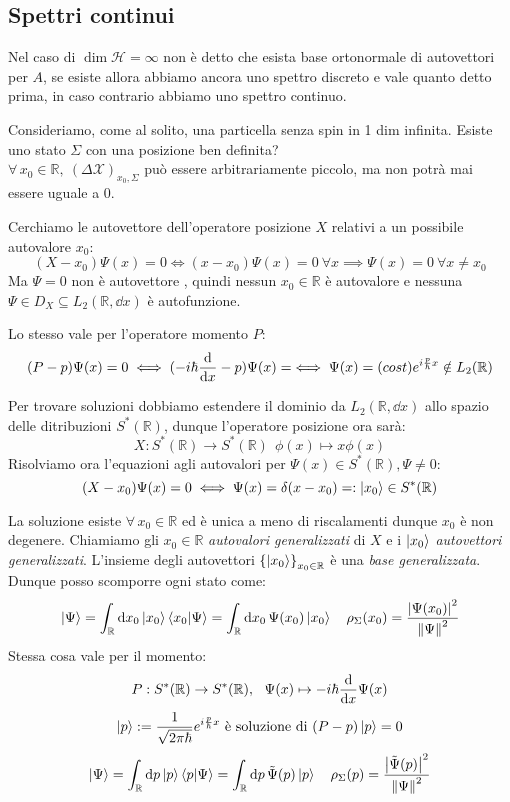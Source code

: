 \subsection{Spettri continui}

Nel caso di \(\dim \mathcal{H}= \infty\) non è detto che esista base ortonormale di autovettori per \(A\),
se esiste allora abbiamo ancora uno spettro discreto e vale quanto detto prima, in caso contrario abbiamo uno spettro continuo.

\begin{example}
    Consideriamo, come al solito, una particella senza spin in 1 dim infinita. Esiste uno stato \(\Sigma\) con una posizione ben definita?\\
    \(\forall\, x_0 \in \mathbb{R}, \ (\Delta \mathcal{X})_{x_0, \Sigma}\) può essere arbitrariamente piccolo, ma non potrà mai essere uguale a \(0\).
\end{example}

Cerchiamo le autovettore dell'operatore posizione \(X\) relativi a un possibile autovalore \(x_0\):
\[
    (X-x_0)\Psi(x)= 0 \iff (x-x_0)\Psi(x)= 0 \ \forall x \implies \Psi(x) = 0 \ \forall x \neq x_0
\]
Ma \(\Psi= 0\) non è autovettore , quindi nessun \(x_0 \in \mathbb{R}\) è autovalore e nessuna \(\Psi \in D_X\subseteq L_2(\mathbb{R},\dd{x})\) è autofunzione.

Lo stesso vale per l'operatore momento \(P\):
\[
    (P-p)\Psi(x)=0 \iff ( -i\hbar\dv{x} - p ) \Psi(x) = \iff \Psi(x)= (cost)e^{i\frac{p}{\hbar}x} \notin L_2(\mathbb{R})
\]

Per trovare soluzioni dobbiamo estendere il dominio da \(L_2(\mathbb{R},\dd{x})\) allo spazio delle ditribuzioni \(S^*(\mathbb{R})\), 
dunque l'operatore posizione ora sarà: 
\[
    X: S^*(\mathbb{R})\to S^*(\mathbb{R}) \ \ \phi(x)\mapsto x\phi(x)
\]
Risolviamo ora l'equazioni agli autovalori per \(\Psi(x) \in S^*(\mathbb{R}), \Psi\neq 0 \):
\begin{equation}
    (X-x_0)\Psi(x)= 0 \iff \Psi(x)= \delta(x-x_0) = : \ket{x_0} \in S^*(\mathbb{R})
\end{equation}

La soluzione esiste \(\forall\, x_0 \in \mathbb{R}\) ed è unica a meno di riscalamenti dunque \(x_0\) è non degenere.
Chiamiamo gli \(x_0 \in \mathbb{R}\) \textit{autovalori generalizzati} di \(X\) e  i \(\ket{x_0}\)  \textit{autovettori generalizzati}. 
L'insieme degli autovettori \(\left\{ \ket{x_0} \right\}_{x_0 \in \mathbb{R}}\) è una \textit{base generalizzata}. Dunque posso scomporre ogni stato come:
\[
    \ket{\Psi}= \int_{\mathbb{R}}\dd{x_0} \ket{x_0} \braket{x_0}{\Psi} = \int_\mathbb{R} \dd{x_0} \Psi(x_0) \ket{x_0} 
    \quad \rho_\Sigma(x_0) = \frac{\abs{\Psi(x_0)}^2}{\norm{\Psi}^2}
\]
Stessa cosa vale per il momento:
\[
    P: S^*(\mathbb{R})\to S^*(\mathbb{R}),\ \  \Psi(x) \mapsto -i\hbar \dv{x}\Psi(x)
\]
\[
    \ket{p}:= \frac{1}{\sqrt{2\pi \hbar}}e ^{i\frac{p}{\hbar}x} \text{ è soluzione di }  (P-p)\ket{p}=0
\]
\[
    \ket{\Psi} = \int_\mathbb{R} \dd{p} \ket{p} \braket{p}{\Psi}= \int_\mathbb{R} \dd{p} \tilde{\Psi}(p)\ket{p} \quad 
    \rho_\Sigma(p)= \frac{\abs{\tilde{\Psi}(p)}^2}{\norm{\Psi}^2}
\]

